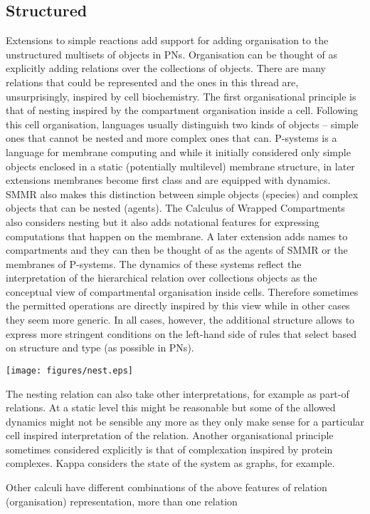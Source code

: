 \documentclass[phd]{infthesis}
\begin{document}
\subsection{Structured}
Extensions to simple reactions add support for adding organisation to the unstructured
multisets of objects in PNs. Organisation can be thought of as explicitly adding relations
over the collections of objects. There are many relations that could be represented and
the ones in this thread are, unsurprisingly, inspired by cell biochemistry. The
first organisational principle is that of nesting inspired by the compartment
organisation inside a cell. Following this cell organisation, languages usually
distinguish two kinds of objects -- simple ones that cannot be nested and more
complex ones that can. P-systems is a language for membrane computing and while
it initially considered only simple objects enclosed in a static (potentially
multilevel) membrane structure, in later extensions membranes become first class
and are equipped with dynamics. SMMR also makes this distinction between simple
objects (species) and complex objects that can be nested (agents). The Calculus of
Wrapped Compartments also considers nesting but it also adds notational features
for expressing computations that happen on the membrane. A later extension adds
names to compartments and they can then be thought of as the agents of SMMR or the
membranes of P-systems. The dynamics of these systems reflect the interpretation
of the hierarchical relation over collections objects as the conceptual view of
compartmental organisation inside cells. Therefore sometimes the permitted operations are
directly inspired by this view while in other cases they seem more generic. In
all cases, however, the additional structure allows to express more stringent
conditions on the left-hand side of rules that select based on structure and
type (as possible in PNs).
\begin{center}
    \texttt{[image: figures/nest.eps]}
\end{center}
The nesting relation can also take other interpretations, for example as
part-of relations. At a static level this might be reasonable but some of the
allowed dynamics might not be sensible any more as they only make sense for a
particular cell inspired interpretation of the relation. 
Another organisational principle sometimes considered explicitly is that of
complexation inspired by protein complexes. Kappa considers the state of the
system as graphs, for example.

Other calculi have different combinations of the above features of relation
(organisation) representation, more than one relation
\end{document}
